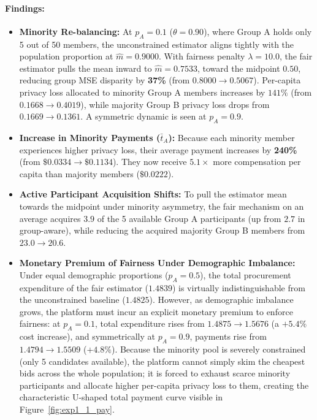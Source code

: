 \documentclass[11pt,a4paper]{article}
\begin{document}
\paragraph{Findings:}
\begin{itemize}[leftmargin=1.5em]
    \item \textbf{Minority Re-balancing:} At $p_A = 0.1$ ($\theta = 0.90$), where Group A holds only 5 out of 50 members, the unconstrained estimator aligns tightly with the population proportion at $\widehat{m} = 0.9000$. With fairness penalty $\lambda = 10.0$, the fair estimator pulls the mean inward to $\widehat{m} = \mathbf{0.7533}$, toward the midpoint $0.50$, reducing group MSE disparity by \textbf{37\%} (from $0.8000 \to 0.5067$). Per-capita privacy loss allocated to minority Group A members increases by $141\%$ (from $0.1668 \to \mathbf{0.4019}$), while majority Group B privacy loss drops from $0.1669 \to 0.1361$. A symmetric dynamic is seen at $p_A = 0.9$.
    \item \textbf{Increase in Minority Payments ($\bar{t}_A$):} Because each minority member experiences higher privacy loss, their average payment increases by \textbf{240\%} (from $\$0.0334 \to \mathbf{\$0.1134}$). They now receive $\mathbf{5.1\times}$ more compensation per capita than majority members ($\$0.0222$).
    \item \textbf{Active Participant Acquisition Shifts:} To pull the estimator mean towards the midpoint under minority asymmetry, the fair mechanism on an average acquires $3.9$ of the 5 available Group A participants (up from $2.7$ in group-aware), while reducing the acquired majority Group B members from $23.0 \to 20.6$.
    \item \textbf{Monetary Premium of Fairness Under Demographic Imbalance:} Under equal demographic proportions ($p_A = 0.5$), the total procurement expenditure of the fair estimator ($1.4839$) is virtually indistinguishable from the unconstrained baseline ($1.4825$). However, as demographic imbalance grows, the platform must incur an explicit monetary premium to enforce fairness: at $p_A = 0.1$, total expenditure rises from $1.4875 \to \mathbf{1.5676}$ (a $+5.4\%$ cost increase), and symmetrically at $p_A = 0.9$, payments rise from $1.4794 \to \mathbf{1.5509}$ ($+4.8\%$). Because the minority pool is severely constrained (only 5 candidates available), the platform cannot simply skim the cheapest bids across the whole population; it is forced to exhaust scarce minority participants and allocate higher per-capita privacy loss to them, creating the characteristic U-shaped total payment curve visible in Figure~\ref{fig:exp1_1_pay}.
\end{itemize}
\end{document}
